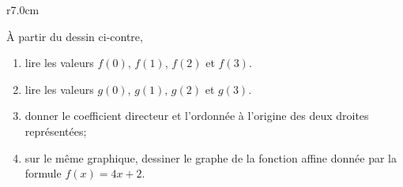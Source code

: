 
\begin{exercice}\label{exosmath-0511}

\begin{wrapfigure}{r}{7.0cm}
   \vspace{-0.5cm}        %
   \centering
   
\end{wrapfigure}

À partir du dessin ci-contre,
\begin{enumerate}
    \item
        lire les valeurs \( f(0)\), \( f(1)\), \( f(2)\) et \( f(3)\).
    \item
        lire les valeurs \( g(0)\), \( g(1)\), \( g(2)\) et \( g(3)\).
    \item
        donner le coefficient directeur et l'ordonnée à l'origine des deux droites représentées;
    \item
       sur le même graphique, dessiner le graphe de la fonction affine donnée par la formule \( f(x)=4x+2\).
\end{enumerate}

\end{exercice}
